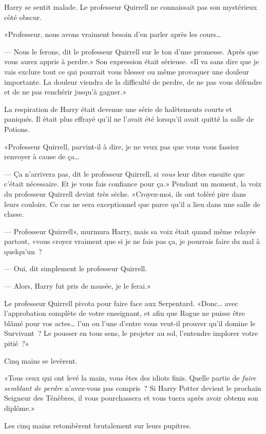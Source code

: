 Harry se sentit malade. Le professeur Quirrell ne connaissait pas son mystérieux côté obscur.

«Professeur, nous avons vraiment besoin d'en parler après les cours…

--- Nous le ferons, dit le professeur Quirrell sur le ton d'une promesse. Après que vous aurez appris à perdre.» Son expression était sérieuse. «Il va sans dire que je vais exclure tout ce qui pourrait vous blesser ou même provoquer une douleur importante. La douleur viendra de la difficulté de perdre, de ne pas vous défendre et de ne pas renchérir jusqu'à gagner.»

La respiration de Harry était devenue une série de halètements courts et paniqués. Il était plus effrayé qu'il ne l'avait été lorsqu'il avait quitté la salle de Potions.

«Professeur Quirrell, parvint-il à dire, je ne veux pas que vous vous fassiez renvoyer à cause de ça…

--- Ça n'arrivera pas, dit le professeur Quirrell, si \emph{vous} leur dites ensuite que c'était nécessaire. Et je vous fais confiance pour ça.» Pendant un moment, la voix du professeur Quirrell devint très sèche. «Croyez-moi, ils ont toléré pire dans leurs couloirs. Ce cas ne sera exceptionnel que parce qu'il a lieu dans une salle de classe.

--- Professeur Quirrell», murmura Harry, mais sa voix était quand même relayée partout, «vous croyez vraiment que si je ne fais pas ça, je pourrais faire du mal à quelqu'un~?

--- Oui, dit simplement le professeur Quirrell.

--- Alors, Harry fut pris de nausée, je le ferai.»

Le professeur Quirrell pivota pour faire face aux Serpentard. «Donc… avec l'approbation complète de votre enseignant, et afin que Rogue ne puisse être blâmé pour vos actes… l'un ou l'une d'entre vous veut-il prouver qu'il domine le Survivant~? Le pousser en tous sens, le projeter au sol, l'entendre implorer votre pitié~?»

Cinq mains se levèrent.

«Tous ceux qui ont levé la main, vous êtes des idiots finis. Quelle partie de \emph{faire semblant de perdre} n'avez-vous pas compris~? Si Harry Potter devient le prochain Seigneur des Ténèbres, il vous pourchassera et vous tuera après avoir obtenu son diplôme.»

Les cinq mains retombèrent brutalement sur leurs pupitres.

